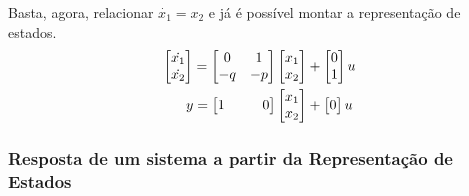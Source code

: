 \documentclass{article}
\numberwithin{equation}{section}
\begin{document}
    \noindent Basta, agora, relacionar $\dot{x_{1}}=x_{2}$ e já é possível montar a representação de estados.
    \begin{equation*}
        \begin{split}%
            \begin{bmatrix}
                \dot{x_{1}}  \\
                \dot{x_{2}}
            \end{bmatrix}
            = %
            \begin{bmatrix}
                0 & 1\\
                -q & -p\\
            \end{bmatrix}
            &\begin{bmatrix}
                x_{1} \\
                x_{2}
            \end{bmatrix}
            + %
            \begin{bmatrix}
                0\\
                1
            \end{bmatrix}
            u
         \\
            y =
            \begin{bmatrix}
               1\hspace{0.6cm} & 0\\
            \end{bmatrix}
            &\begin{bmatrix}
                x_{1} \\
                x_{2}
            \end{bmatrix}
            + \hspace{0.005cm}
            \begin{bmatrix}
                0
            \end{bmatrix}
            u
        \end{split}
    \end{equation*}

    \subsubsection{Resposta de um sistema a partir da Representação de Estados}
    \label{subsubsec:est_resposta}
\end{document}
